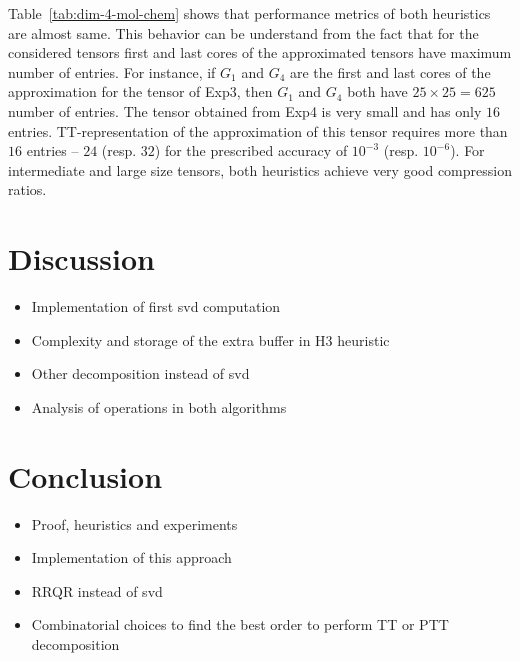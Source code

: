 \documentclass[runningheads]{llncs}
\begin{document}
\noindent Table~\ref{tab:dim-4-mol-chem} shows that performance metrics of both heuristics are almost same. This behavior can be understand from the fact that for the considered tensors first and last cores of the approximated tensors have maximum number of entries. For instance, if $G_1$ and $G_4$ are the first and last cores of the approximation for the tensor of Exp3, then $G_1$ and $G_4$ both have $25\times25=625$ number of entries. The tensor obtained from Exp4 is very small and has only $16$ entries. TT-representation of the approximation of this tensor requires more than $16$ entries -- $24$ (resp. $32$) for the prescribed accuracy of $10^{-3}$ (resp. $10^{-6}$). For intermediate and large size tensors, both heuristics achieve very good compression ratios.
 
\section{Discussion}
\label{sec:discussion}
\begin{itemize}
	\item Implementation of first svd computation
	\item Complexity and storage of the extra buffer in H3 heuristic
	\item Other decomposition instead of svd
	\item Analysis of operations in both algorithms
\end{itemize}

\section{Conclusion}
\label{sec:conclusion}
\begin{itemize}
	\item Proof, heuristics and experiments
	\item Implementation of this approach
	\item RRQR instead of svd
	\item Combinatorial choices to find the best order to perform TT or PTT decomposition
\end{itemize}

%
%
%
 
 
\end{document}
